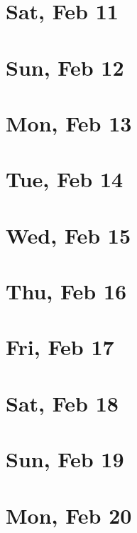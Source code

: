 	\section{Sat, Feb 11}
		
	\section{Sun, Feb 12}
		
	\section{Mon, Feb 13}
		
	\section{Tue, Feb 14}
		
	\section{Wed, Feb 15}
		
	\section{Thu, Feb 16}
		
	\section{Fri, Feb 17}
		
	\section{Sat, Feb 18}
		
	\section{Sun, Feb 19}
		
	\section{Mon, Feb 20}
		
